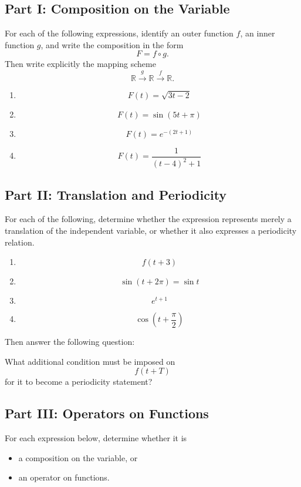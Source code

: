 \documentclass{article}
\begin{document}
	\subsection*{Part I: Composition on the Variable}
	
	For each of the following expressions, identify an outer function \(f\), an inner function \(g\), and write the composition in the form
	\[
	F=f\circ g.
	\]
	Then write explicitly the mapping scheme
	\[
	\mathbb{R}\xrightarrow{\;g\;}\mathbb{R}\xrightarrow{\;f\;}\mathbb{R}.
	\]
	
	\begin{enumerate}
		\item
		\[
		F(t)=\sqrt{3t-2}
		\]
		\item
		\[
		F(t)=\sin(5t+\pi)
		\]
		\item
		\[
		F(t)=e^{-(2t+1)}
		\]
		\item
		\[
		F(t)=\frac{1}{(t-4)^2+1}
		\]
	\end{enumerate}
	
	\subsection*{Part II: Translation and Periodicity}
	
	For each of the following, determine whether the expression represents merely a translation of the independent variable, or whether it also expresses a periodicity relation.
	
	\begin{enumerate}
		\item
		\[
		f(t+3)
		\]
		\item
		\[
		\sin(t+2\pi)=\sin t
		\]
		\item
		\[
		e^{t+1}
		\]
		\item
		\[
		\cos\!\left(t+\frac{\pi}{2}\right)
		\]
	\end{enumerate}
	
	Then answer the following question:
	
	What additional condition must be imposed on
	\[
	f(t+T)
	\]
	for it to become a periodicity statement?
	
	\subsection*{Part III: Operators on Functions}
	
	For each expression below, determine whether it is
	
	\begin{itemize}
		\item a composition on the variable, or
		\item an operator on functions.
	\end{itemize}
	
\end{document}
